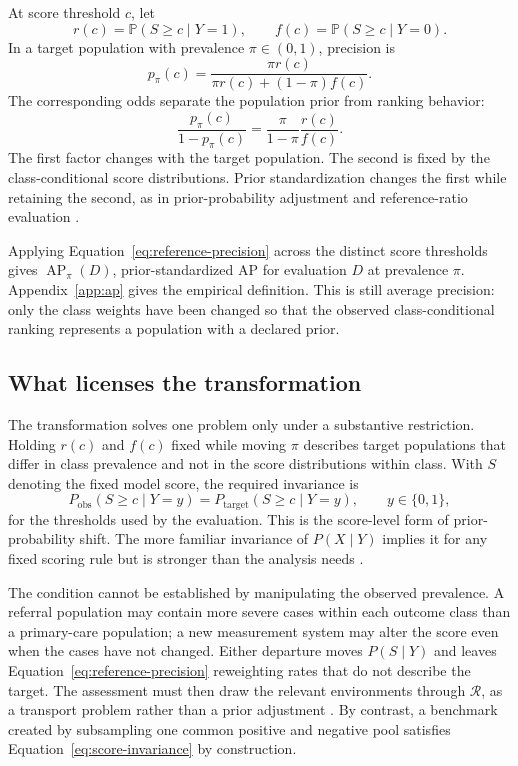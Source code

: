 \documentclass[11pt]{article}
\newcommand{\AP}{\operatorname{AP}}
\newcommand{\Regime}{\mathcal{R}}
\newcommand{\Prb}{\mathbb{P}}
\theoremstyle{remark}
\begin{document}
At score threshold $c$, let
\[
r(c)=\Prb(S\geq c\mid Y=1),
\qquad
f(c)=\Prb(S\geq c\mid Y=0).
\]
In a target population with prevalence $\pi\in(0,1)$, precision is
\begin{equation}
p_\pi(c)
=
\frac{\pi r(c)}
{\pi r(c)+(1-\pi)f(c)}.
\label{eq:reference-precision}
\end{equation}
The corresponding odds separate the population prior from ranking behavior:
\begin{equation}
\frac{p_\pi(c)}{1-p_\pi(c)}
=
\frac{\pi}{1-\pi}\frac{r(c)}{f(c)}.
\label{eq:precision-odds}
\end{equation}
The first factor changes with the target population. The second is fixed by the class-conditional score distributions. Prior standardization changes the first while retaining the second, as in prior-probability adjustment and reference-ratio evaluation \cite{elkan2001foundations,siblini2020calibration}.

Applying Equation~\eqref{eq:reference-precision} across the distinct score thresholds gives $\AP_\pi(D)$, prior-standardized AP for evaluation $D$ at prevalence $\pi$. Appendix~\ref{app:ap} gives the empirical definition. This is still average precision: only the class weights have been changed so that the observed class-conditional ranking represents a population with a declared prior.

\subsection{What licenses the transformation}
\label{sec:transport}

The transformation solves one problem only under a substantive restriction. Holding $r(c)$ and $f(c)$ fixed while moving $\pi$ describes target populations that differ in class prevalence and not in the score distributions within class. With $S$ denoting the fixed model score, the required invariance is
\begin{equation}
P_{\mathrm{obs}}(S\geq c\mid Y=y)
=
P_{\mathrm{target}}(S\geq c\mid Y=y),
\qquad y\in\{0,1\},
\label{eq:score-invariance}
\end{equation}
for the thresholds used by the evaluation. This is the score-level form of prior-probability shift. The more familiar invariance of $P(X\mid Y)$ implies it for any fixed scoring rule but is stronger than the analysis needs \cite{saerens2002adjusting,storkey2009training,lipton2018detecting}.

The condition cannot be established by manipulating the observed prevalence. A referral population may contain more severe cases within each outcome class than a primary-care population; a new measurement system may alter the score even when the cases have not changed. Either departure moves $P(S\mid Y)$ and leaves Equation~\eqref{eq:reference-precision} reweighting rates that do not describe the target. The assessment must then draw the relevant environments through $\Regime$, as a transport problem rather than a prior adjustment \cite{bareinboim2013transportability}. By contrast, a benchmark created by subsampling one common positive and negative pool satisfies Equation~\eqref{eq:score-invariance} by construction.
\end{document}
